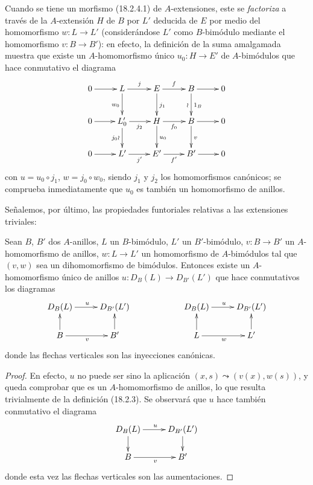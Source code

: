 \begin{env}[18.2.8]
Cuando se tiene un morfismo (18.2.4.1) de $A$-extensiones, este se \emph{factoriza}
a través de la $A$-extensión $H$ de $B$ por $L'$ deducida de $E$ por medio
del homomorfismo $w:L\to L'$ (considerándose $L'$ como $B$-bimódulo mediante
el homomorfismo $v:B\to B'$): en efecto, la definición de la suma amalgamada
muestra que existe un $A$-homomorfismo único $u_0:H\to E'$ de
$A$-bimódulos que hace conmutativo el diagrama
\[
  \xymatrix{
    0\ar[r] & L\ar[r]^j\ar[d]_{w_0} & E\ar[r]^f\ar[d]^{j_1}
      & B\ar[r]\ar[d]^{1_B}_{\wr} & 0\\
    0\ar[r] & L'_0\ar[r]_{j_2}\ar[d]_{j_0\wr}
      & H\ar[r]_{f_0}\ar[d]^{u_0} & B\ar[r]\ar[d]^v & 0\\
    0\ar[r] & L'\ar[r]_{j'} & E'\ar[r]_{f'} & B'\ar[r] & 0
  }
\]
con $u=u_0\circ j_1$, $w=j_0\circ w_0$, siendo $j_1$ y $j_2$ los
homomorfismos canónicos; se comprueba inmediatamente que $u_0$ es también un
homomorfismo de anillos.

Señalemos, por último, las propiedades funtoriales relativas a las extensiones
triviales:
\end{env}

\begin{proposition}[18.2.9]
\label{0.18.2.9-fr}
Sean $B$, $B'$ dos $A$-anillos, $L$ un $B$-bimódulo, $L'$ un
$B'$-bimódulo, $v:B\to B'$ un $A$-homomorfismo de anillos, $w:L\to L'$ un
homomorfismo de $A$-bimódulos tal que $(v,w)$ sea un dihomomorfismo de
bimódulos. Entonces existe un $A$-homomorfismo único de anillos
$u:D_B(L)\to D_{B'}(L')$ que hace conmutativos los diagramas
\[
  \xymatrix@C=2.2pc@R=1.6pc{
    D_B(L)\ar[r]^u & D_{B'}(L') & & D_B(L)\ar[r]^u & D_{B'}(L')\\
    B\ar[u]\ar[r]_v & B'\ar[u] & & L\ar[u]\ar[r]_w & L'\ar[u]
  }
\]
donde las flechas verticales son las inyecciones canónicas.
\end{proposition}


\begin{proof}
En efecto, $u$ no puede ser sino la aplicación
$(x,s)\leadsto(v(x),w(s))$, y queda comprobar que es un
$A$-homomorfismo de anillos, lo que resulta trivialmente de la definición
(18.2.3). Se observará que $u$ hace también conmutativo el diagrama
\[
  \xymatrix@C=2.2pc@R=1.5pc{
    D_B(L)\ar[r]^u\ar[d] & D_{B'}(L')\ar[d]\\
    B\ar[r]_v & B'
  }
\]
donde esta vez las flechas verticales son las aumentaciones.
\end{proof}

